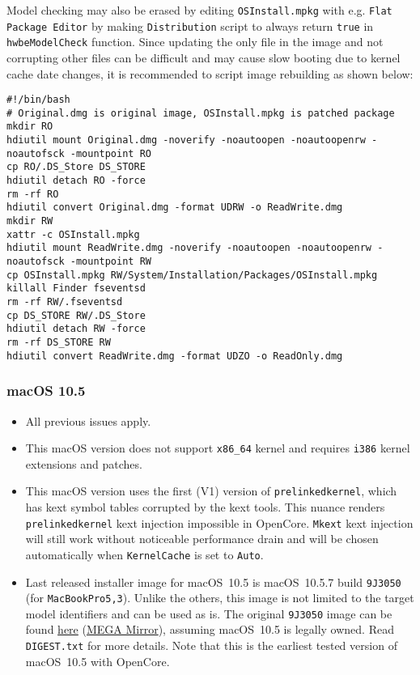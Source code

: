 \documentclass[]{article}
\makeatletter
\renewcommand{\label}[1]{%
\zref@wrapper@immediate{\oldlabel{#1}}}  %
\makeatother
\begin{document}
  Model checking may also be erased by editing \texttt{OSInstall.mpkg}
  with e.g. \texttt{Flat Package Editor} by making \texttt{Distribution}
  script to always return \texttt{true} in \texttt{hwbeModelCheck} function.
  Since updating the only file in the image and not corrupting other files
  can be difficult and may cause slow booting due to kernel cache date
  changes, it is recommended to script image rebuilding as shown below:

\begin{lstlisting}[label=snowrebuild, style=ocbash]
#!/bin/bash
# Original.dmg is original image, OSInstall.mpkg is patched package
mkdir RO
hdiutil mount Original.dmg -noverify -noautoopen -noautoopenrw -noautofsck -mountpoint RO
cp RO/.DS_Store DS_STORE
hdiutil detach RO -force
rm -rf RO
hdiutil convert Original.dmg -format UDRW -o ReadWrite.dmg
mkdir RW
xattr -c OSInstall.mpkg
hdiutil mount ReadWrite.dmg -noverify -noautoopen -noautoopenrw -noautofsck -mountpoint RW
cp OSInstall.mpkg RW/System/Installation/Packages/OSInstall.mpkg
killall Finder fseventsd
rm -rf RW/.fseventsd
cp DS_STORE RW/.DS_Store
hdiutil detach RW -force
rm -rf DS_STORE RW
hdiutil convert ReadWrite.dmg -format UDZO -o ReadOnly.dmg
\end{lstlisting}

\subsubsection{macOS 10.5}\label{legacy105}

\begin{itemize}
  \item All previous issues apply.
  \item This macOS version does not support \texttt{x86\_64} kernel
    and requires \texttt{i386} kernel extensions and patches.
  \item This macOS version uses the first (V1) version of \texttt{prelinkedkernel},
    which has kext symbol tables corrupted by the kext tools. This nuance
    renders \texttt{prelinkedkernel} kext injection impossible in OpenCore.
    \texttt{Mkext} kext injection will still work without noticeable
    performance drain and will be chosen automatically when
    \texttt{KernelCache} is set to \texttt{Auto}.
  \item Last released installer image for macOS~10.5 is macOS~10.5.7
    build \texttt{9J3050} (for \texttt{MacBookPro5,3}). Unlike the others,
    this image is not limited to the target model identifiers and can be used
    as is. The original \texttt{9J3050} image can be found
    \href{https://archive.org/details/10.5.7-9-j-3050}{here}
    (\href{https://mega.nz/folder/inRBTarD#zanf7fUbviwz3WHBU5xpCg}{MEGA Mirror}),
    assuming macOS~10.5 is legally owned. Read \texttt{DIGEST.txt}
    for more details. Note that this is the earliest tested
    version of macOS~10.5 with OpenCore.
\end{itemize}
\end{document}
